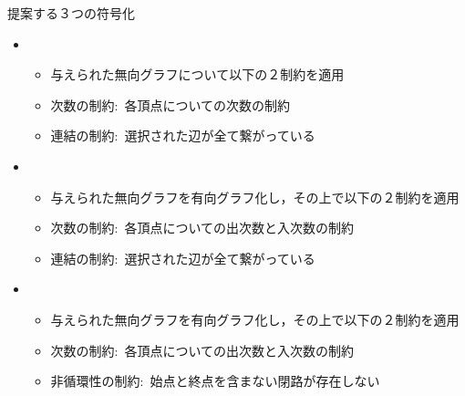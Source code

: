 \documentclass[dvipdfmx,11pt]{beamer}
\begin{document}
\begin{frame}{提案する３つの符号化}
  \begin{itemize}
  \item {}
    \begin{itemize}
    \item 与えられた無向グラフについて以下の２制約を適用
    \item \alert{次数の制約}:\ 各頂点についての次数の制約
    \item \alert{連結の制約}:\ 選択された辺が全て繋がっている
    \end{itemize}
  \item {}
    \begin{itemize}
    \item 与えられた無向グラフを有向グラフ化し，その上で以下の２制約を適用
    \item \alert{次数の制約}:\ 各頂点についての出次数と入次数の制約
    \item \alert{連結の制約}:\ 選択された辺が全て繋がっている
    \end{itemize}
  \item {}
    \begin{itemize}
    \item 与えられた無向グラフを有向グラフ化し，その上で以下の２制約を適用
    \item \alert{次数の制約}:\ 各頂点についての出次数と入次数の制約
    \item \alert{非循環性の制約}:\ 始点と終点を含まない閉路が存在しない
    \end{itemize}
  \end{itemize}
\end{frame}
\end{document}
